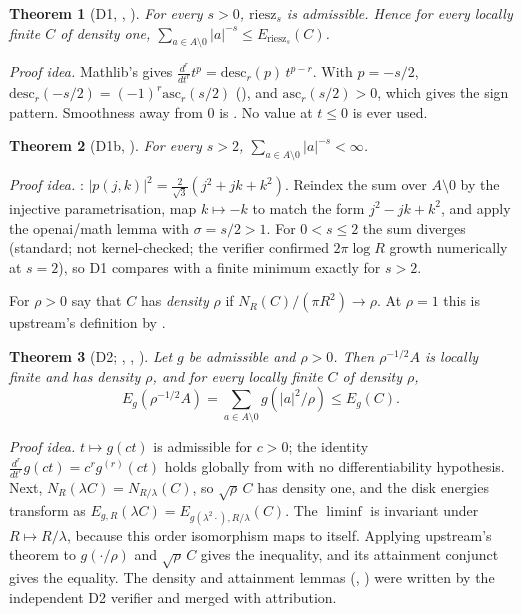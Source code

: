 \documentclass[11pt]{article}
\newtheorem{theorem}{Theorem}
\begin{document}
\begin{theorem}[D1, , ]
For every $s>0$, $\mathrm{riesz}_s$ is admissible. Hence for every locally finite $C$ of density one,
$\sum_{a\in A\setminus0}|a|^{-s}\le E_{\mathrm{riesz}_s}(C)$.
\end{theorem}
\noindent\emph{Proof idea.} Mathlib's  gives $\frac{d^r}{dt^r}t^{p}=\mathrm{desc}_r(p)\,t^{p-r}$. With
$p=-s/2$, $\mathrm{desc}_r(-s/2)=(-1)^r\mathrm{asc}_r(s/2)$ (), and $\mathrm{asc}_r(s/2)>0$, which
gives the sign pattern. Smoothness away from $0$ is . No value at $t\le0$ is ever used.

\begin{theorem}[D1b, ]
For every $s>2$, $\sum_{a\in A\setminus0}|a|^{-s}<\infty$.
\end{theorem}
\noindent\emph{Proof idea.} : $|p(j,k)|^2=\tfrac{2}{\sqrt3}(j^2+jk+k^2)$. Reindex the sum over $A\setminus0$ by the
injective parametrisation, map $k\mapsto-k$ to match the form $j^2-jk+k^2$, and apply the openai/math lemma
 with $\sigma=s/2>1$. For $0<s\le2$ the sum diverges (standard; not kernel-checked; the verifier confirmed
$2\pi\log R$ growth numerically at $s=2$), so D1 compares with a finite minimum exactly for $s>2$.

For $\rho>0$ say that $C$ has \emph{density} $\rho$ if $N_R(C)/(\pi R^2)\to\rho$. At $\rho=1$ this is upstream's definition by
.

\begin{theorem}[D2; , , ]
Let $g$ be admissible and $\rho>0$. Then $\rho^{-1/2}A$ is locally finite and has density $\rho$, and for every locally finite $C$ of
density $\rho$,
\[ E_g(\rho^{-1/2}A)=\sum_{a\in A\setminus0} g(|a|^2/\rho)\le E_g(C). \]
\end{theorem}
\noindent\emph{Proof idea.} $t\mapsto g(ct)$ is admissible for $c>0$; the identity $\frac{d^r}{dt^r}g(ct)=c^r g^{(r)}(ct)$ holds globally from
 with no differentiability hypothesis. Next, $N_R(\lambda C)=N_{R/\lambda}(C)$, so $\sqrt\rho\,C$ has density one, and
the disk energies transform as $E_{g,R}(\lambda C)=E_{g(\lambda^2\cdot),R/\lambda}(C)$. The $\liminf$ is invariant under $R\mapsto R/\lambda$,
because this order isomorphism maps  to itself. Applying upstream's theorem to $g(\cdot/\rho)$ and $\sqrt\rho\,C$ gives the
inequality, and its attainment conjunct gives the equality. The density and attainment lemmas (, ) were
written by the independent D2 verifier and merged with attribution.
\end{document}
